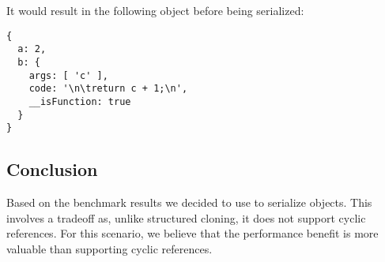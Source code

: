 It would result in the following object before being serialized:
\begin{lstlisting}[caption=Example processed context]
{
  a: 2,
  b: {
    args: [ 'c' ],
    code: '\n\treturn c + 1;\n',
    __isFunction: true
  }
}
\end{lstlisting}

\subsection{Conclusion}
Based on the benchmark results we decided to use  to serialize  objects. This involves a tradeoff as, unlike structured cloning, it does not support cyclic references. For this scenario, we believe that the performance benefit is more valuable than supporting cyclic references.

\pagebreak